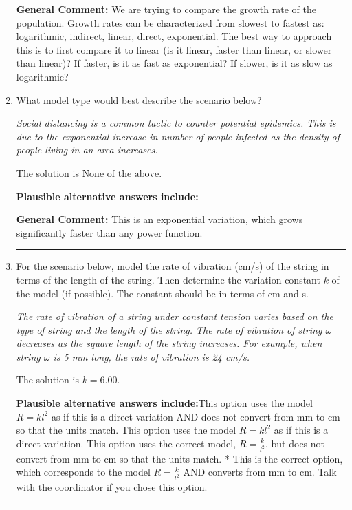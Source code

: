 \documentclass{extbook}[14pt]
\newcommand{\litem}[1]{\item #1

\rule{\textwidth}{0.4pt}}
\begin{document}
\begin{enumerate}
{\textbf{General Comment:} We are trying to compare the growth rate of the population. Growth rates can be characterized from slowest to fastest as: logarithmic, indirect, linear, direct, exponential. The best way to approach this is to first compare it to linear (is it linear, faster than linear, or slower than linear)? If faster, is it as fast as exponential? If slower, is it as slow as logarithmic?
}
\litem{
What model type would best describe the scenario below?

\begin{center}
    \textit{ Social distancing is a common tactic to counter potential epidemics. This is due to the exponential increase in number of people infected as the density of people living in an area increases. }
\end{center}
The solution is \( \text{None of the above} \).\begin{enumerate}[label=\Alph*.]
\textbf{Plausible alternative answers include:}



\end{enumerate}

\textbf{General Comment:} This is an exponential variation, which grows significantly faster than any power function.
}
\litem{
For the scenario below, model the rate of vibration (cm/s) of the string in terms of the length of the string. Then determine the variation constant $k$ of the model (if possible). The constant should be in terms of cm and s.

\begin{center}
    \textit{ The rate of vibration of a string under constant tension varies based on the type of string and the length of the string. The rate of vibration of string $\omega$ decreases as the square length of the string increases. For example, when string $\omega$ is 5 mm long, the rate of vibration is 24 cm/s. }
\end{center}
The solution is \( k = 6.00 \).\begin{enumerate}[label=\Alph*.]
\textbf{Plausible alternative answers include:}This option uses the model $R = kl^{2}$ as if this is a direct variation AND does not convert from mm to cm so that the units match.
This option uses the model $R = kl^{2}$ as if this is a direct variation.
This option uses the correct model, $R = \frac{k}{l^{2}}$, but does not convert from mm to cm so that the units match.
* This is the correct option, which corresponds to the model $R = \frac{k}{l^{2}}$ AND converts from mm to cm.
Talk with the coordinator if you chose this option.
\end{enumerate}

}
\end{enumerate}
\end{document}
